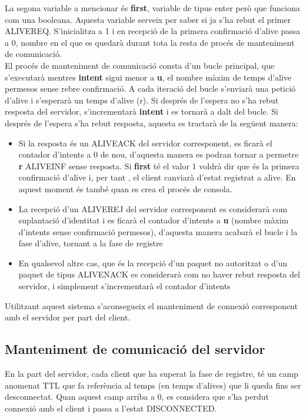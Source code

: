 \documentclass{article}
\begin{document}
La segona variable a mencionar és \textbf{first}, variable de tipus enter
però que funciona com una booleana. Aquesta variable serveix per saber si
ja s'ha rebut el primer ALIVE\textunderscore REQ. S'inicialitza a 1 i 
en recepció de la primera confirmació d'alive passa a 0, nombre en 
el que es quedarà durant tota la resta de procés de manteniment 
de comunicació.\\

El procés de manteniment de comunicació consta d'un bucle principal, 
que s'executarà mentres \textbf{intent} sigui menor a \textbf{u}, 
el nombre màxim de temps d'alive permesos sense rebre confirmació.  
A cada iteració del bucle s'enviarà una petició d'alive i s'esperarà
un temps d'alive (r). Si després de l'espera no s'ha rebut resposta
del servidor, s'incrementarà \textbf{intent} i es tornarà a dalt del
bucle. Si després de l'espera s'ha rebut resposta, aquesta es tractarà
de la següent manera:
\begin{itemize}
\item Si la resposta és un ALIVE\textunderscore ACK 
del servidor corresponent, es ficarà el contador d'intents a 0 de 
nou, d'aquesta manera es podran tornar a permetre \textbf{r} 
ALIVE\textunderscore INF sense resposta. Si \textbf{first} té el
valor 1 voldrà dir que és la primera confirmació d'alive i, per tant
, el client canviarà d'estat registrat a alive. En aquest moment és
també quan es crea el procés de consola. 
\item La recepció d'un ALIVE\textunderscore REJ del servidor corresponent
es considerarà com suplantació d'identitat i es ficarà el contador 
d'intents a \textbf{u} (nombre màxim d'intents sense confirmació 
permesos), d'aquesta manera acabarà el bucle i la fase d'alive, tornant 
a la fase de registre
\item En qualsevol altre cas, que és la recepció d'un paquet no autoritzat
o d'un paquet de tipus ALIVE\textunderscore NACK es considerarà com no haver 
rebut resposta del servidor, i simplement s'incrementarà el contador d'intents
\end{itemize}
Utilitzant aquest sistema s'aconsegueix el manteniment de connexió  corresponent 
amb el servidor per part del client.
 

\subsection{Manteniment de comunicació del servidor}

En la part del servidor, cada client que ha superat la fase de registre, té un camp
anomenat TTL que fa referència al temps (en temps d'alives) que li queda fins ser 
desconnectat. Quan aquest camp arriba a 0, es considera que s'ha perdut connexió amb
el client i passa a l'estat DISCONNECTED.\\
\end{document}
